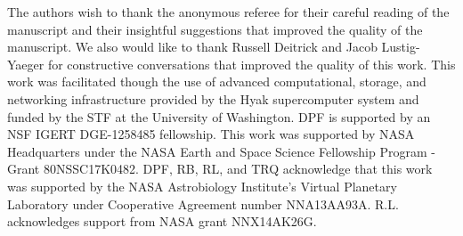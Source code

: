 \acknowledgments
The authors wish to thank the anonymous referee for their careful reading of the manuscript and their insightful suggestions that improved the quality of the manuscript.  We also would like to thank Russell Deitrick and Jacob Lustig-Yaeger for constructive conversations that improved the quality of this work.  This work was facilitated though the use of advanced computational, storage, and networking infrastructure provided by the Hyak supercomputer system and funded by the STF at the University of Washington. DPF is supported by an NSF IGERT DGE-1258485 fellowship.  This work was supported by NASA Headquarters under the NASA Earth and Space Science Fellowship Program - Grant 80NSSC17K0482.  DPF, RB, RL, and TRQ acknowledge that this work was supported by the NASA Astrobiology Institute's Virtual Planetary Laboratory under Cooperative Agreement number NNA13AA93A. R.L. acknowledges support from NASA grant NNX14AK26G.







